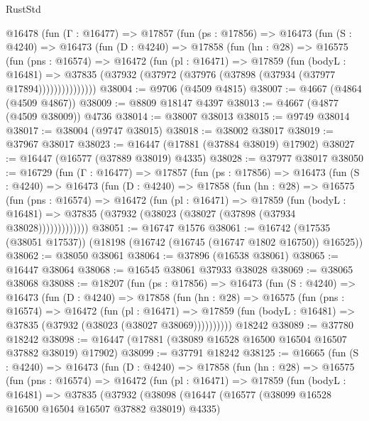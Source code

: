 \begin{lexlean}{RustStd}
\begin{coremodule}
{\begin{coremodule}
{{{{{{{{{{{{{{{{{{{{{{{{{{{{{{{{{{{{{{{{{{{{{{{{{{{{{{{    @16478
      (fun (Γ : @16477) =>
      @17857
        (fun (ps : @17856) =>
        @16473
          (fun (S : @4240) =>
          @16473
            (fun (D : @4240) =>
            @17858
              (fun (hn : @28) =>
              @16575
                (fun (pns : @16574) =>
                @16472
                  (fun (pl : @16471) =>
                  @17859
                    (fun (bodyL : @16481) =>
                    @37835 (@37932 (@37972 (@37976 (@37898 (@37934 (@37977 @17894)))))))))))))))
@38004 := @9706 (@4509 @4815)
@38007 := @4667 (@4864 (@4509 @4867))
@38009 := @8809 @18147 @4397
@38013 := @4667 (@4877 (@4509 @38009)) @4736
@38014 := @38007 @38013
@38015 := @9749 @38014
@38017 := @38004 (@9747 @38015)
@38018 := @38002 @38017
@38019 := @37967 @38017
@38023 := @16447 (@17881 (@37884 @38019) @17902)
@38027 := @16447 (@16577 (@37889 @38019) @4335)
@38028 := @37977 @38017
@38050 := @16729
    (fun (Γ : @16477) =>
    @17857
      (fun (ps : @17856) =>
      @16473
        (fun (S : @4240) =>
        @16473
          (fun (D : @4240) =>
          @17858
            (fun (hn : @28) =>
            @16575
              (fun (pns : @16574) =>
              @16472
                (fun (pl : @16471) =>
                @17859
                  (fun (bodyL : @16481) =>
                  @37835 (@37932 (@38023 (@38027 (@37898 (@37934 @38028)))))))))))))
@38051 := @16747 @1576
@38061 := @16742 (@17535 (@38051 @17537)) (@18198 (@16742 (@16745 (@16747 @1802 @16750)) @16525))
@38062 := @38050 @38061
@38064 := @37896 (@16538 @38061)
@38065 := @16447 @38064
@38068 := @16545 @38061 @37933 @38028
@38069 := @38065 @38068
@38088 := @18207
    (fun (ps : @17856) =>
    @16473
      (fun (S : @4240) =>
      @16473
        (fun (D : @4240) =>
        @17858
          (fun (hn : @28) =>
          @16575
            (fun (pns : @16574) =>
            @16472
              (fun (pl : @16471) =>
              @17859 (fun (bodyL : @16481) => @37835 (@37932 (@38023 (@38027 @38069))))))))))
    @18242
@38089 := @37780 @18242
@38098 := @16447 (@17881 (@38089 @16528 @16500 @16504 @16507 @37882 @38019) @17902)
@38099 := @37791 @18242
@38125 := @16665
    (fun (S : @4240) =>
    @16473
      (fun (D : @4240) =>
      @17858
        (fun (hn : @28) =>
        @16575
          (fun (pns : @16574) =>
          @16472
            (fun (pl : @16471) =>
            @17859
              (fun (bodyL : @16481) =>
              @37835
                (@37932
                  (@38098
                    (@16447
                      (@16577 (@38099 @16528 @16500 @16504 @16507 @37882 @38019) @4335)
}}}}}}}}}}}}}}}}}}}}}}}}}}}}}}}}}}}}}}}}}}}}}}}}}}}}}}}
\end{coremodule}}
\end{coremodule}
\end{lexlean}
